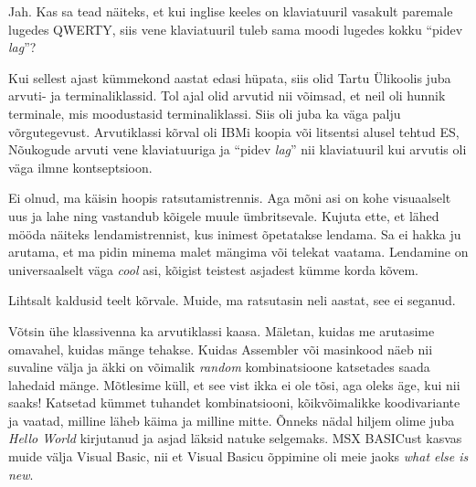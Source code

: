 
Jah. Kas sa tead näiteks, et kui inglise keeles on klaviatuuril vasakult paremale lugedes 
QWERTY, siis vene klaviatuuril tuleb sama moodi lugedes kokku \enquote{pidev \emph{lag}}? 


Kui sellest ajast kümmekond aastat edasi hüpata, siis olid Tartu Ülikoolis juba arvuti- ja 
terminaliklassid. Tol ajal olid arvutid nii võimsad, et neil oli 
hunnik terminale, mis moodustasid terminaliklassi. Siis oli juba ka
väga palju võrgutegevust. Arvutiklassi kõrval oli 
IBMi koopia või litsentsi alusel tehtud ES, Nõukogude arvuti vene klaviatuuriga ja \enquote{pidev \emph{lag}} nii klaviatuuril kui arvutis oli väga ilmne kontseptsioon.


Ei olnud, ma käisin hoopis ratsutamistrennis. Aga mõni 
asi on kohe visuaalselt uus ja lahe ning vastandub 
kõigele muule ümbritsevale. Kujuta ette, et lähed mööda näiteks
lendamistrennist, kus inimest õpetatakse lendama. Sa ei hakka ju arutama, et ma pidin minema malet mängima või telekat vaatama. 
Lendamine on universaalselt väga \emph{cool} asi, kõigist 
teistest asjadest kümme korda kõvem.


Lihtsalt kaldusid teelt kõrvale. Muide, ma ratsutasin neli aastat, see ei seganud.

Võtsin ühe klassivenna ka arvutiklassi kaasa. Mäletan, kuidas me arutasime omavahel, kuidas mänge tehakse. Kuidas Assembler või 
masinkood näeb nii suvaline välja ja äkki on 
võimalik \emph{random} kombinatsioone katsetades saada 
lahedaid mänge. Mõtlesime küll, et see vist ikka ei ole tõsi, 
aga oleks äge, kui nii saaks! Katsetad kümmet tuhandet 
kombinatsiooni, kõikvõimalikke koodivariante ja vaatad, milline läheb käima 
ja milline mitte. Õnneks nädal hiljem olime juba \emph{Hello 
World} kirjutanud ja asjad läksid natuke selgemaks. MSX 
BASICust kasvas muide välja Visual 
Basic, nii et Visual Basicu õppimine oli meie jaoks 
\emph{what else is new}.

